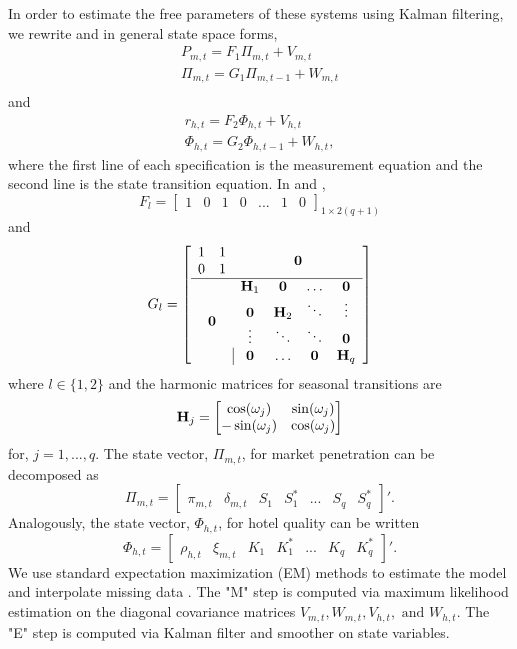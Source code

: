\documentclass[12pt, leqno]{article}
\begin{document}
In order to estimate the free parameters of these systems using Kalman filtering, we rewrite  and  in general state space forms,
\begin{equation}\label{eq:penetration_dlm_ssm}
\begin{split}
P_{m,t} = F_1\Pi_{m,t}+V_{m,t} \\
\Pi_{m,t} = G_1\Pi_{m,t-1}+W_{m,t} \\
\end{split}
\end{equation}
and
\begin{equation}\label{eq:ratings_dlm_ssm}
\begin{split}
r_{h,t} = F_2\Phi_{h,t}+V_{h,t} \\
\Phi_{h,t} = G_2\Phi_{h,t-1}+W_{h,t},
\end{split}
\end{equation}
where the first line of each specification is the measurement equation and the second line is the state transition equation. In  and , 
$$
F_l=\begin{bmatrix}
1 & 0 & 1 & 0 &...& 1 & 0
\end{bmatrix}_{1\times 2(q+1)}
$$ and 
$$
G_l=
\left[
\begin{array}{c|c}
\begin{matrix}
1&1\\		
0&1
\end{matrix}& \bold{0} \\
\hline
\bold{0} & \begin{matrix}
\bold{H}_1 & \bold{0} & \dots& \bold{0} \\
\bold{0} & \bold{H}_2 & \ddots & \vdots \\
\vdots &\ddots & \ddots & \bold{0} \\
\bold{0} &\dots & \bold{0} & \bold{H}_q
\end{matrix}
\end{array}
\right]
$$
where $l\in \{ 1, 2 \}$ and the harmonic matrices for seasonal transitions are
$$
\bold{H}_j=
\begin{bmatrix}
\cos(\omega_j) & \sin(\omega_j) \\
-\sin(\omega_j) & \cos(\omega_j)
\end{bmatrix}
$$
for, $j=1,...,q$. The state vector, $\Pi_{m,t}$, for market penetration can be decomposed as 
$$
\Pi_{m,t} = \begin{bmatrix}
\pi_{m, t} & \delta_{m,t} & S_1 & S_1^{*} & ... & S_q&S_q^{*}
\end{bmatrix}'.
$$
Analogously, the state vector, $\Phi_{h,t}$, for hotel quality can be written 
$$
\Phi_{h,t} = \begin{bmatrix}
\rho_{h, t} & \xi_{m,t} & K_1 & K_1^{*} & ... & K_q&K_q^{*}
\end{bmatrix}'.
$$
We use standard expectation maximization (EM) methods to estimate the model and interpolate missing data . The "M" step is computed via maximum likelihood estimation on the diagonal covariance matrices $V_{m,t}, W_{m,t}, V_{h,t}, \text{ and }W_{h,t}$. The "E" step is computed via Kalman filter and smoother on state variables.
\end{document}
